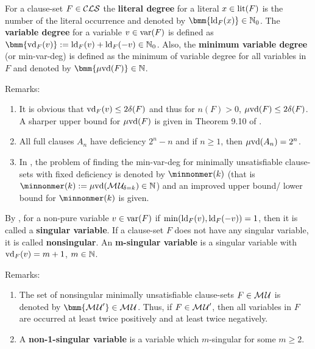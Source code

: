 \documentclass{article}
\begin{document}
\begin{defi}\label{def:degree}
For a clause-set $F \in \mathcal{CLS}$ the \textbf{literal degree} for a literal $x \in \operatorname{lit}(F)$ is the number of the literal occurrence and denoted by $\bmm{\ldeg_F(x)} \in \NNZ$. The \textbf{variable degree} for a variable $v \in \operatorname{var}(F)$ is defined as $\bmm{\vdeg_F(v)} := \ldeg_F(v) + \ldeg_F(-v) \in \NNZ$. Also, the \textbf{minimum variable degree} (or min-var-deg) is defined as the minimum of variable degree for all variables in $F$ and denoted by $\bmm{\minvdeg(F)} \in \NN$.
\end{defi}
Remarks:
  \begin{enumerate}
  \item It is obvious that $\operatorname{vd}_F(v) \le 2 \delta(F)$ and thus for $n(F) >0$, $\operatorname{\mu\!\operatorname{vd}}(F) \le 2 \delta(F)$. A sharper upper bound for $\operatorname{\mu\!\operatorname{vd}}(F)$ is given in Theorem 9.10 of \cite{KullmannZhao2010Extremal}.
  \item All full clauses $A_n$ have deficiency $2^n - n$ and if $n \ge 1$, then  $\operatorname{\mu\!\operatorname{vd}}(A_n) =2^n$.
  \item In \cite{KullmannZhao2010Extremal}, the problem of finding the min-var-deg for minimally unsatisfiable clause-sets with fixed deficiency is denoted by $\minnonmer(k) $ (that is $\minnonmer(k)  :=  \minvdeg(\Musati{\delta=k}) \in \NN$) and an improved upper bound/ lower bound for $\minnonmer(k) $ is given.
    \end{enumerate}
    
\begin{defi}\label{def:singvar}
By \cite{KullmannZhao2012ConfluenceJ}, for a non-pure variable $v \in \operatorname{var}(F)$ if $\min(\operatorname{ld}_F(v) ,\operatorname{ld}_F(-v))=1$, then it is called a \textbf{singular variable}. If a clause-set $F$ does not have any singular variable, it is called \textbf{nonsingular}. An \textbf{m-singular variable} is a singular variable with $\operatorname{vd}_F(v)=m+1$, $m \in \mathbb{N}$.
\end{defi}
Remarks:
  \begin{enumerate}
  \item The set of nonsingular minimally unsatisfiable clause-sets $F \in \mathcal{M\hspace{0.8pt}U}$ is denoted by $\bmm{\Musat'} \in \Musat$. Thus, if $F \in \mathcal{M\hspace{0.8pt}U}'$, then all variables in $F$ are occurred at least twice positively and at least twice negatively.
  \item A \textbf{non-1-singular variable} is a variable which $m$-singular for some $m \ge 2$.
   \end{enumerate}
 
\end{document}

